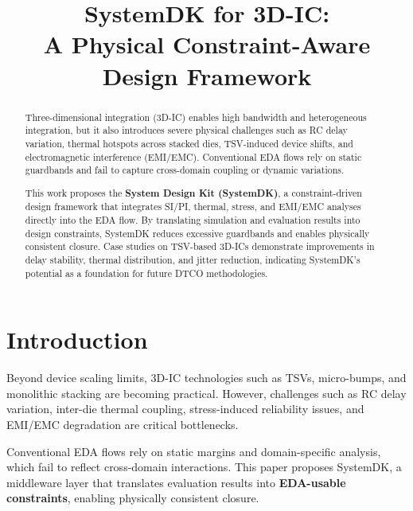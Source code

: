 \documentclass[conference]{IEEEtran}
\begin{document}
\title{SystemDK for 3D-IC: \\
A Physical Constraint-Aware Design Framework}

\author{
}

\maketitle

\begin{abstract}
Three-dimensional integration (3D-IC) enables high bandwidth and heterogeneous integration, but it also introduces severe physical challenges such as RC delay variation, thermal hotspots across stacked dies, TSV-induced device shifts, and electromagnetic interference (EMI/EMC). Conventional EDA flows rely on static guardbands and fail to capture cross-domain coupling or dynamic variations. 

This work proposes the \textbf{System Design Kit (SystemDK)}, a constraint-driven design framework that integrates SI/PI, thermal, stress, and EMI/EMC analyses directly into the EDA flow. By translating simulation and evaluation results into design constraints, SystemDK reduces excessive guardbands and enables physically consistent closure. Case studies on TSV-based 3D-ICs demonstrate improvements in delay stability, thermal distribution, and jitter reduction, indicating SystemDK’s potential as a foundation for future DTCO methodologies.
\end{abstract}

\section{Introduction}
Beyond device scaling limits, 3D-IC technologies such as TSVs, micro-bumps, and monolithic stacking are becoming practical. 
However, challenges such as RC delay variation, inter-die thermal coupling, stress-induced reliability issues, and EMI/EMC degradation are critical bottlenecks. 

Conventional EDA flows rely on static margins and domain-specific analysis, which fail to reflect cross-domain interactions. 
This paper proposes SystemDK, a middleware layer that translates evaluation results into \textbf{EDA-usable constraints}, enabling physically consistent closure.
\end{document}
